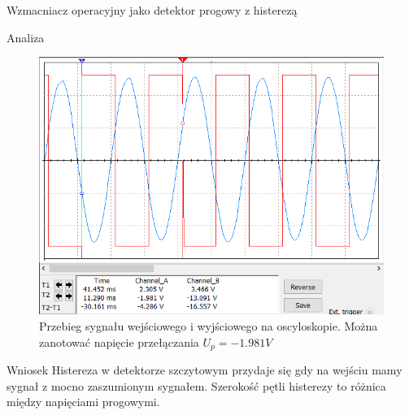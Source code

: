 \documentclass[a4paper]{scrartcl}
\begin{document}
\begin{section}{Wzmacniacz operacyjny jako detektor progowy z histerezą}
\begin{subsection}{Analiza}
\begin{figure}[!ht]
				\end{figure}
		\clearpage
				\begin{figure}[!ht]
				\begin{center}
					\includegraphics[width=0.7\linewidth]{09-osc-prze}
					\caption{Przebieg sygnału wejściowego i wyjściowego na oscyloskopie. Można zanotować napięcie przełączania $U_{p} = -1.981V$}
				\end{center}
				\end{figure}
		\end{subsection}
		\begin{subsection}{Wniosek}
			Histereza w detektorze szczytowym przydaje się gdy na wejściu mamy sygnał z mocno zaszumionym sygnałem. Szerokość pętli histerezy to różnica między napięciami progowymi.
		\end{subsection}
	\end{section}
\end{document}
